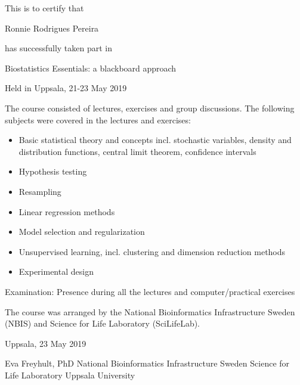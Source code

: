 \documentclass[12pt]{article}\usepackage[]{graphicx}\usepackage[]{color}
\newcommand{\courseName}{Biostatistics Essentials: a blackboard approach}
\newcommand{\courseLocation}{Uppsala}
\newcommand{\courseDate}{21-23 May 2019}
\newcommand{\courseLastDay}{23 May 2019}
\newcommand{\courseExaminer}{Eva Freyhult, PhD}
\begin{document}
\large
This is to certify that 


\LARGE
Ronnie Rodrigues Pereira

\large
has successfully taken part in \newline

\LARGE
\begin{center}{\courseName}  \end{center} 


\large
\begin{center} Held in {\courseLocation}, {\courseDate} \end{center} 

\vspace{5mm}
\normalsize
The course consisted of lectures, exercises and group discussions. The following subjects were covered in the lectures and exercises:
\begin{itemize}
  \item Basic statistical theory and concepts incl. stochastic variables, density and distribution functions, central limit theorem, confidence intervals
  \item Hypothesis testing
  \item Resampling
  \item Linear regression methods
  \item Model selection and regularization
  \item Unsupervised learning, incl. clustering and dimension reduction methods
  \item Experimental design
\end{itemize}




\vspace{5mm}
Examination: \newline
Presence during all the lectures and computer/practical exercises

\vspace{8mm}
The course was arranged by the National Bioinformatics Infrastructure Sweden (NBIS) and Science for Life Laboratory (SciLifeLab).


\vspace{8mm}
{\courseLocation}, {\courseLastDay}
\vspace{22mm}


{\courseExaminer} \newline
\small
National Bioinformatics Infrastructure Sweden \newline
Science for Life Laboratory \newline
Uppsala University \newline
\end{document}
